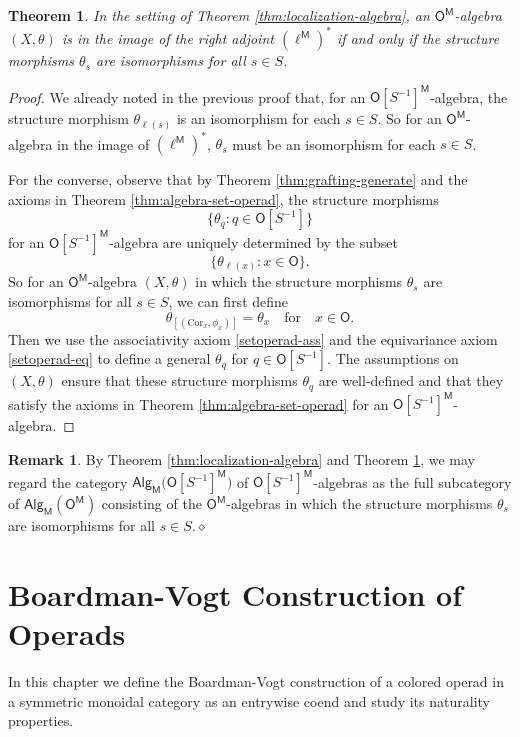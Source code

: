 \documentclass[11pt]{amsbook}
\numberwithin{section}{chapter}
\numberwithin{subsection}{section}
\numberwithin{equation}{section}
\theoremstyle{plain}
\newtheorem{theorem}[equation]{Theorem}
\theoremstyle{definition}
\newtheorem{remark}[equation]{Remark}
\newcommand{\Cor}{\mathrm{Cor}}
\newcommand{\M}{\mathsf{M}}
\renewcommand{\O}{\mathsf{O}}
\newcommand{\Otom}{\O^{\M}}
\newcommand{\ellm}{\ell^{\M}}
\newcommand{\ellmstar}{(\ellm)^*}
\newcommand{\dqed}{\hfill$\diamond$}
\newcommand{\inv}[1]{{#1}^{-1}}
\newcommand{\Sinv}{\inv{S}}
\newcommand{\Osinv}{\O[\Sinv]}
\newcommand{\Osinvtom}{\Osinv^{\M}}
\newcommand{\Osinvm}{\Osinvtom}
\newcommand{\alg}{\mathsf{Alg}}
\newcommand{\algm}{\alg_{\M}}
\newcommand{\algmotom}{\algm(\Otom)}
\newcommand{\algmosinvtom}{\algm\bigl(\Osinvtom\bigr)}
\newcommand{\forspace}{\quad\text{for}\quad}
\begin{document}
\begin{theorem}\label{osinvm-algebra}
In the setting of Theorem \ref{thm:localization-algebra}, an $\Otom$-algebra $(X,\theta)$ is in the image of the right adjoint $\ellmstar$ if and only if the structure morphisms $\theta_s$ are isomorphisms for all $s \in S$.
\end{theorem}

\begin{proof}
We already noted in the previous proof that, for an $\Osinvm$-algebra, the structure morphism  $\theta_{\ell(s)}$ is an isomorphism for each $s \in S$.  So for an $\Otom$-algebra in the image of $\ellmstar$, $\theta_s$ must be an isomorphism for each $s \in S$.  

For the converse, observe that by Theorem \ref{thm:grafting-generate} and the axioms in Theorem \ref{thm:algebra-set-operad}, the structure morphisms \[\bigl\{\theta_q : q \in \Osinv\bigr\}\] for an $\Osinvm$-algebra are uniquely determined by the subset \[\bigl\{\theta_{\ell(x)} : x \in \O\bigr\}.\]  So for an $\Otom$-algebra $(X,\theta)$ in which the structure morphisms $\theta_s$ are isomorphisms for all $s \in S$, we can first define 
\[\theta_{[(\Cor_x,\phi_x)]} = \theta_x \forspace x\in\O.\]  Then we use the associativity axiom \eqref{setoperad-ass} and the equivariance axiom \eqref{setoperad-eq} to define a general $\theta_q$ for $q \in \Osinv$.  The assumptions on $(X,\theta)$ ensure that these structure morphisms $\theta_q$ are well-defined and that they satisfy the axioms in Theorem \ref{thm:algebra-set-operad} for an $\Osinvm$-algebra.
\end{proof}

\begin{remark}\label{rk:osinvm-algebras}
By Theorem \ref{thm:localization-algebra} and Theorem \ref{osinvm-algebra}, we may regard the category $\algmosinvtom$ of $\Osinvm$-algebras as the full subcategory of $\algmotom$ consisting of the $\Otom$-algebras in which the structure morphisms $\theta_s$ are isomorphisms for all $s \in S$.\dqed\end{remark}


\chapter{Boardman-Vogt Construction of Operads}\label{ch:bv}

In this chapter we define the Boardman-Vogt construction of a colored operad in a symmetric monoidal category as an entrywise coend and study its naturality properties.  
\end{document}
